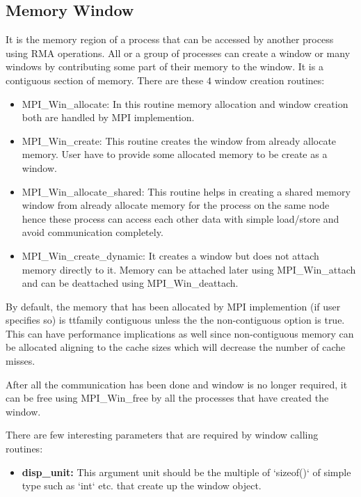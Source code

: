 \documentclass[12pt]{article}
\begin{document}
\subsection{Memory Window}
It is the memory region of a process that can be accessed by another process using RMA operations. All or a group of processes can 
create a window or many windows by contributing some part of their memory to the window. It is a contiguous section of memory. There
are these $4$ window creation routines:
\begin{itemize}
    \item {\ttfamily MPI\_Win\_allocate:} In this routine memory allocation and window creation both are handled by MPI implemention.
    \item {\ttfamily MPI\_Win\_create:} This routine creates the window from already allocate memory. User have to provide some allocated
    memory to be create as a window.
    \item {\ttfamily MPI\_Win\_allocate\_shared:} This routine helps in creating a shared memory window from already allocate memory for
    the process on the same node hence these process can access each other data with simple load/store and avoid communication completely.
    \item {\ttfamily MPI\_Win\_create\_dynamic:} It creates a window but does not attach memory directly to it. Memory can be attached later
    using {\ttfamily MPI\_Win\_attach} and can be deattached using {\ttfamily MPI\_Win\_deattach}. 
\end{itemize}

By default, the memory that has been allocated by MPI implemention (if user specifies so) is {ttfamily contiguous} unless the
the {\ttfamily non-contiguous} option is {\ttfamily true.} This can have performance implications as well since {\ttfamily non-contiguous}
memory can be allocated aligning to the cache sizes which will decrease the number of cache misses.

After all the communication has been done and window is no longer required, it can be free using {\ttfamily MPI\_Win\_free} by all the 
processes that have created the window. 

There are few interesting parameters that are required by window calling routines:
\begin{itemize}
    \item \textbf{disp\_unit:} This argument unit should be the multiple of `sizeof()` of simple type such as `int` etc. that create up the window object.
\end{itemize}
\end{document}
